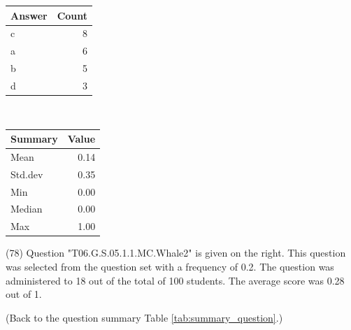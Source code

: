 \documentclass[12pt,nohyper]{tufte-handout}\usepackage[]{graphicx}\usepackage[]{color}
\begin{document}
\begin{center}%
\begin{tabular}{lr}
  \hline
Answer & Count \\ 
  \hline
c &   8 \\ 
  a &   6 \\ 
  b &   5 \\ 
  d &   3 \\ 
   \hline
\end{tabular}
~~~~~~~~%
\begin{tabular}{lr}
  \hline
Summary & Value \\ 
  \hline
Mean & 0.14 \\ 
  Std.dev & 0.35 \\ 
  Min & 0.00 \\ 
  Median & 0.00 \\ 
  Max & 1.00 \\ 
   \hline
\end{tabular}
\end{center}\newpage{} (78) Question "T06.G.S.05.1.1.MC.Whale2" is given on the right. This question was selected from the question set with a frequency of 0.2. The question was administered to 18 out of the total of 100 students. The average score was 0.28 out of 1.

 (Back to the question summary Table \ref{tab:summary_question}.)
\end{document}
